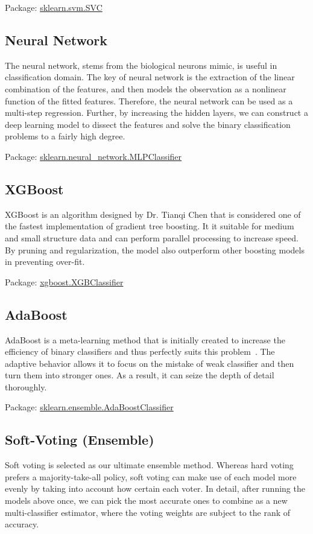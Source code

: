 \documentclass[10pt,twocolumn,letterpaper]{article}
\begin{document}
Package: \href{https://scikit-learn.org/stable/modules/generated/sklearn.svm.SVC.html}{sklearn.svm.SVC}


\subsection{Neural Network}
The neural network, stems from the biological neurons mimic, is useful in classification domain. The key of neural network is the extraction of the linear combination of the features, and then models the observation as a nonlinear function of the fitted features. Therefore, the neural network can be used as a multi-step regression. Further, by increasing the hidden layers, we can construct a deep learning model to dissect the features and solve the binary classification problems to a fairly high degree.

Package: \href{https://scikit-learn.org/stable/modules/generated/sklearn.neural_network.MLPClassifier.html}{sklearn.neural\_network.MLPClassifier}


\subsection{XGBoost}
XGBoost is an algorithm designed by Dr. Tianqi Chen that is considered one of the fastest implementation of gradient tree boosting. It it suitable for medium and small structure data and can perform parallel processing to increase speed. By pruning and regularization, the model also outperform other boosting models in preventing over-fit. 

Package: \href{https://xgboost.readthedocs.io/en/latest/python/python_intro.html}{xgboost.XGBClassifier}


\subsection{AdaBoost}
AdaBoost is a meta-learning method that is initially created to increase the efficiency of binary classifiers and thus perfectly suits this problem~\cite{freund1999short}. The adaptive behavior allows it to focus on the mistake of weak classifier and then turn them into stronger ones. As a result, it can seize the depth of detail thoroughly.

Package: \href{https://scikit-learn.org/stable/modules/generated/sklearn.ensemble.AdaBoostClassifier.html}{sklearn.ensemble.AdaBoostClassifier}


\subsection{Soft-Voting (Ensemble)}
Soft voting is selected as our ultimate ensemble method. Whereas hard voting prefers a majority-take-all policy, soft voting can make use of each model more evenly by taking into account how certain each voter. In detail, after running the models above once, we can pick the most accurate ones to combine as a new multi-classifier estimator, where the voting weights are subject to the rank of accuracy.
\end{document}

